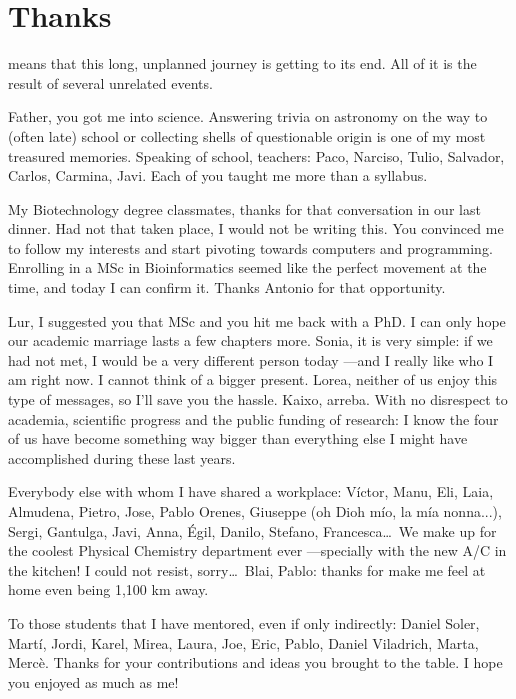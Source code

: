
\chapter*{Thanks}

 means that this long, unplanned journey is getting to its end. All of it is the result of several unrelated events.

Father, you got me into science. Answering trivia on astronomy on the way to (often late) school or collecting shells of questionable origin is one of my most treasured memories. Speaking of school, teachers: Paco, Narciso, Tulio, Salvador, Carlos, Carmina, Javi. Each of you taught me more than a syllabus.

My Biotechnology degree classmates, thanks for that conversation in our last dinner. Had not that taken place, I would not be writing this. You convinced me to follow my interests and start pivoting towards computers and programming. Enrolling in a MSc in Bioinformatics seemed like the perfect movement at the time, and today I can confirm it. Thanks Antonio for that opportunity.

Lur, I suggested you that MSc and you hit me back with a PhD. I can only hope our academic marriage lasts a few chapters more. Sonia, it is very simple: if we had not met, I would be a very different person today ---and I really like who I am right now. I cannot think of a bigger present. Lorea, neither of us enjoy this type of messages, so I'll save you the hassle. Kaixo, arreba. With no disrespect to academia, scientific progress and the public funding of research: I know the four of us have become something way bigger than everything else I might have accomplished during these last years.

Everybody else with whom I have shared a workplace: Víctor, Manu, Eli, Laia, Almudena, Pietro, Jose, Pablo Orenes, Giuseppe (oh Dioh mío, la mía nonna...), Sergi, Gantulga, Javi, Anna, Égil, Danilo, Stefano, Francesca\ldots\ We make up for the coolest Physical Chemistry department ever ---specially with the new A/C in the kitchen! I could not resist, sorry\ldots\ Blai, Pablo: thanks for make me feel at home even being 1,100 km away.  

To those students that I have mentored, even if only indirectly: Daniel Soler, Martí, Jordi, Karel, Mirea, Laura, Joe, Eric, Pablo, Daniel Viladrich, Marta, Mercè. Thanks for your contributions and ideas you brought to the table. I hope you enjoyed as much as me! 

